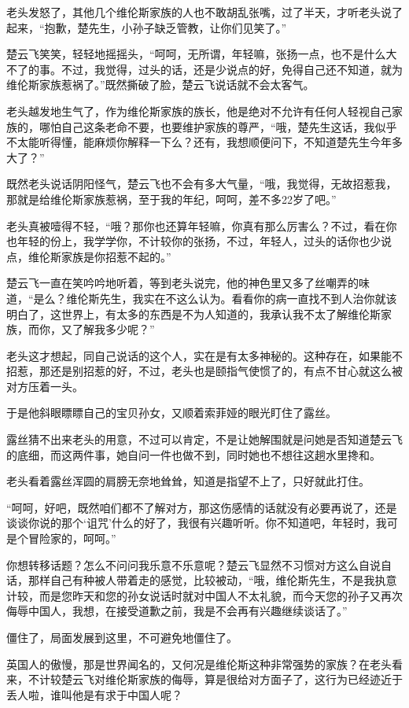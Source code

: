 老头发怒了，其他几个维伦斯家族的人也不敢胡乱张嘴，过了半天，才听老头说了起来，“抱歉，楚先生，小孙子缺乏管教，让你们见笑了。”

楚云飞笑笑，轻轻地摇摇头，“呵呵，无所谓，年轻嘛，张扬一点，也不是什么大不了的事。不过，我觉得，过头的话，还是少说点的好，免得自己还不知道，就为维伦斯家族惹祸了。”既然撕破了脸，楚云飞说话就不会太客气。

老头越发地生气了，作为维伦斯家族的族长，他是绝对不允许有任何人轻视自己家族的，哪怕自己这条老命不要，也要维护家族的尊严，“哦，楚先生这话，我似乎不太能听得懂，能麻烦你解释一下么？还有，我想顺便问下，不知道楚先生今年多大了？”

既然老头说话阴阳怪气，楚云飞也不会有多大气量，“哦，我觉得，无故招惹我，那就是给维伦斯家族惹祸，至于我的年纪，呵呵，差不多22岁了吧。”

老头真被噎得不轻，“哦？那你也还算年轻嘛，你真有那么厉害么？不过，看在你也年轻的份上，我学学你，不计较你的张扬，不过，年轻人，过头的话你也少说点，维伦斯家族是你招惹不起的。”

楚云飞一直在笑吟吟地听着，等到老头说完，他的神色里又多了丝嘲弄的味道，“是么？维伦斯先生，我实在不这么认为。看看你的病一直找不到人治你就该明白了，这世界上，有太多的东西是不为人知道的，我承认我不太了解维伦斯家族，而你，又了解我多少呢？”

老头这才想起，同自己说话的这个人，实在是有太多神秘的。这种存在，如果能不招惹，那还是别招惹的好，不过，老头也是颐指气使惯了的，有点不甘心就这么被对方压着一头。

于是他斜眼瞟瞟自己的宝贝孙女，又顺着索菲娅的眼光盯住了露丝。

露丝猜不出来老头的用意，不过可以肯定，不是让她解围就是问她是否知道楚云飞的底细，而这两件事，她自问一件也做不到，同时她也不想往这趟水里搀和。

老头看着露丝浑圆的肩膀无奈地耸耸，知道是指望不上了，只好就此打住。

“呵呵，好吧，既然咱们都不了解对方，那这伤感情的话就没有必要再说了，还是谈谈你说的那个‘诅咒’什么的好了，我很有兴趣听听。你不知道吧，年轻时，我可是个冒险家的，呵呵。”

你想转移话题？怎么不问问我乐意不乐意呢？楚云飞显然不习惯对方这么自说自话，那样自己有种被人带着走的感觉，比较被动，“哦，维伦斯先生，不是我执意计较，而是您昨天和您的孙女说话时就对中国人不太礼貌，而今天您的孙子又再次侮辱中国人，我想，在接受道歉之前，我是不会再有兴趣继续谈话了。”

僵住了，局面发展到这里，不可避免地僵住了。

英国人的傲慢，那是世界闻名的，又何况是维伦斯这种非常强势的家族？在老头看来，不计较楚云飞对维伦斯家族的侮辱，算是很给对方面子了，这行为已经迹近于丢人啦，谁叫他是有求于中国人呢？

